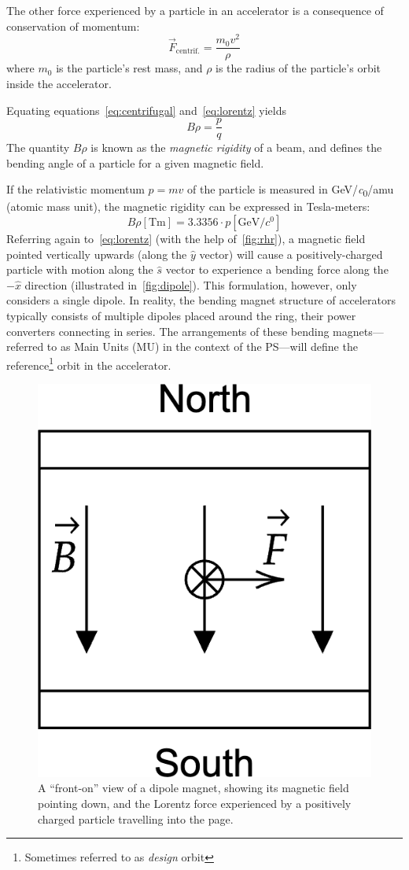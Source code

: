 \documentclass[a4paper,twoside,11pt]{report}
\begin{document}
The other force experienced by a particle in an accelerator is a consequence of conservation of momentum:
\begin{equation}
\vec F_{\text{centrif.}}=\frac{m_0v^2}{\rho}\label{eq:centrifugal}
\end{equation} where $m_0$ is the particle's rest mass, and $\rho$ is the radius of the particle's orbit inside the accelerator.

Equating equations~\ref{eq:centrifugal} and~\ref{eq:lorentz} yields
\begin{equation}
B\rho=\frac pq
\label{eq:brho}
\end{equation}
The quantity $B\rho$ is known as the \textit{magnetic rigidity} of a beam, and defines the bending angle of a particle for a given magnetic field. 

If the relativistic momentum $p=mv$ of the particle is measured in \unit[per-mode = symbol]{\GeV\per\clight\per amu} (atomic mass unit), the magnetic rigidity can be expressed in Tesla-meters:
\begin{equation}
B\rho \left[\unit{\tesla\meter}\right] = 3.3356\cdot p\left[\unit{\giga\electronvolt\per\clight}\right]
\label{tesla-meters}
\end{equation} %
Referring again to~\autoref{eq:lorentz} (with the help of~\autoref{fig:rhr}), a magnetic field pointed vertically upwards (along the $\hat y$ vector) will cause a positively-charged particle with motion along the $\hat s$ vector to experience a bending force along the $-\hat x$ direction (illustrated in~\autoref{fig:dipole}). This formulation, however, only considers a single dipole. In reality, the bending magnet structure of accelerators typically consists of multiple dipoles placed around the ring, their power converters connecting in series. The arrangements of these bending magnets---referred to as Main Units (MU) in the context of the PS---will define the reference\footnote{Sometimes referred to as \textit{design} orbit} orbit in the accelerator.

\begin{figure}[h]
  \centering
  \includegraphics*[width=0.2\linewidth]{dipole-bending.png}
  \caption[Illustration of the force experienced by a charged particle in a magnetic dipole field.]{A ``front-on'' view of a dipole magnet, showing its magnetic field pointing down, and the Lorentz force experienced by a positively charged particle travelling into the page.}\label{fig:dipole}
\end{figure}
\end{document}
